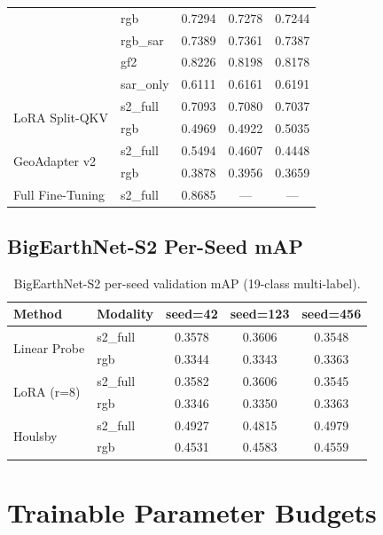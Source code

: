 \begin{table}[h]
\begin{tabular}{llccc}
 & rgb        & 0.7294 & 0.7278 & 0.7244 \\
 & rgb\_sar   & 0.7389 & 0.7361 & 0.7387 \\
 & gf2        & 0.8226 & 0.8198 & 0.8178 \\
 & sar\_only  & 0.6111 & 0.6161 & 0.6191 \\
\midrule
\multirow{2}{*}{LoRA Split-QKV}
 & s2\_full   & 0.7093 & 0.7080 & 0.7037 \\
 & rgb        & 0.4969 & 0.4922 & 0.5035 \\
\midrule
\multirow{2}{*}{GeoAdapter v2}
 & s2\_full   & 0.5494 & 0.4607 & 0.4448 \\
 & rgb        & 0.3878 & 0.3956 & 0.3659 \\
\midrule
Full Fine-Tuning & s2\_full & 0.8685 & --- & --- \\
\bottomrule
\end{tabular}
\end{table}

\subsection{BigEarthNet-S2 Per-Seed mAP}

\begin{table}[h]
\centering
\small
\caption{BigEarthNet-S2 per-seed validation mAP (19-class multi-label).}
\label{tab:bigearthnet-per-seed}
\begin{tabular}{llccc}
\toprule
Method & Modality & seed=42 & seed=123 & seed=456 \\
\midrule
\multirow{2}{*}{Linear Probe}
 & s2\_full   & 0.3578 & 0.3606 & 0.3548 \\
 & rgb        & 0.3344 & 0.3343 & 0.3363 \\
\midrule
\multirow{2}{*}{LoRA (r=8)}
 & s2\_full   & 0.3582 & 0.3606 & 0.3545 \\
 & rgb        & 0.3346 & 0.3350 & 0.3363 \\
\midrule
\multirow{2}{*}{Houlsby}
 & s2\_full   & 0.4927 & 0.4815 & 0.4979 \\
 & rgb        & 0.4531 & 0.4583 & 0.4559 \\
\bottomrule
\end{tabular}
\end{table}

\section{Trainable Parameter Budgets}
\label{app:params}

